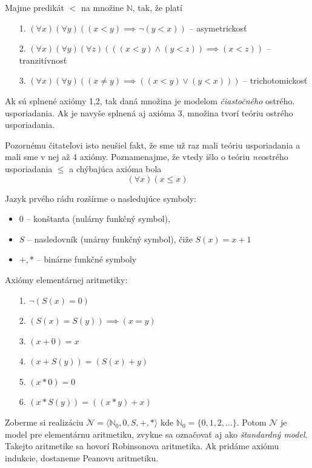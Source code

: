 \begin{priklad}
    Majme predikát $<$ na množine $\mathbb{N}$, tak, že platí
    \begin{itemize}
    \item[1.] $(\forall x)(\forall y) ((x < y) \implies \neg (y < x))$
        -- asymetrickosť

    \item[2.] $(\forall x)(\forall y)(\forall z) (((x<y) \land (y<z)) \implies
        (x<z))$ -- tranzitívnosť

    \item[3.] $(\forall x)(\forall y)( (x\not=y) \implies ((x<y) \lor (y<x)))$
        -- trichotomickosť
    \end{itemize}
    Ak sú splnené axiómy 1,2, tak daná množina je modelom 
    {\it čiastočného} ostrého. usporiadania. Ak je
    navyše splnená aj axióma 3, množina tvorí teóriu ostrého
    usporiadania.
\end{priklad}
\begin{poznamka}
    Pozornému čitateľovi isto neušiel fakt, že sme už raz mali teóriu
    usporiadania a mali sme v nej až 4 axiómy. Poznamenajme, že vtedy
    išlo o teóriu \emph{ne}ostrého usporiadania $\le$ a chýbajúca
    axióma bola
    \begin{equation*}
        (\forall x) (x \le x)
    \end{equation*}
\end{poznamka}

\begin{priklad}
    Jazyk prvého rádu rozšírme o nasledujúce symboly:
    \begin{itemize}
        \item $0$ -- konštanta (nulárny funkčný symbol),
        \item $S$ -- nasledovník (unárny funkčný symbol), čiže $S(x)=x+1$
        \item $+,*$ -- binárne funkčné symboly
    \end{itemize}
    Axiómy elementárnej aritmetiky:
    \begin{itemize}
        \item[1.] $\neg (S(x) = 0)$
        \item[2.] $(S(x) = S(y)) \implies (x=y)$
        \item[3.] $(x+0) = x$
        \item[4.] $(x+S(y)) = (S(x) + y)$
        \item[5.] $(x * 0) = 0$
        \item[6.] $(x * S(y)) = ((x*y)+x)$
    \end{itemize}
    Zoberme si realizáciu 
        $\mathcal{N}=\langle \mathbb{N}_0,0,S,+,* \rangle$ kde  
        $\mathbb{N}_0 = \{0,1,2,\dots\}$.
        Potom $\mathcal{N}$ je model pre elementárnu aritmetiku,
        zvykne sa označovať aj ako \emph{štandardný model}.
        Takejto aritmetike sa hovorí Robinsonova aritmetika.
        Ak pridáme axiómu indukcie, dostaneme Peanovu aritmetiku.
\end{priklad}

